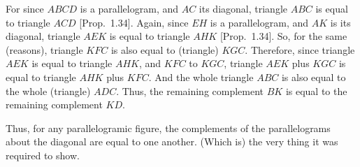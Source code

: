 \begin{Parallel}{}{}
{\epsfysize=1.7in
\centerline{}

For since $ABCD$ is a parallelogram, and $AC$ its diagonal,  triangle
$ABC$ is equal to triangle $ACD$ [Prop.~1.34]. Again, since $EH$ is
a parallelogram, and $AK$ is its diagonal, triangle $AEK$ is equal to
triangle $AHK$ [Prop.~1.34]. So, for the same (reasons), triangle
$KFC$ is also equal to (triangle) $KGC$. Therefore, since triangle $AEK$ is
equal to triangle $AHK$, and $KFC$ to $KGC$, triangle $AEK$ plus $KGC$ is
equal to triangle $AHK$ plus $KFC$. And the whole triangle $ABC$ is
also equal to the whole (triangle) $ADC$. Thus, the remaining complement
$BK$ is equal to the remaining complement $KD$.

Thus, for any parallelogramic figure, the complements of the
parallelograms about the diagonal are equal to one another.
(Which is) the very thing it was required to show.}
\end{Parallel}

